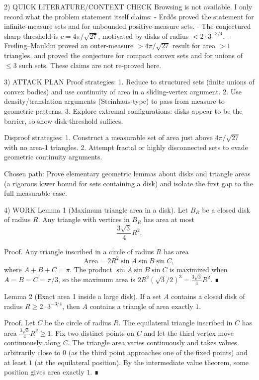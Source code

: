 2) QUICK LITERATURE/CONTEXT CHECK
Browsing is not available. I only record what the problem statement itself claims:
- Erd\H{o}s proved the statement for infinite-measure sets and for unbounded positive-measure sets.
- The conjectured sharp threshold is $c=4\pi/\sqrt{27}$, motivated by disks of radius $<2\cdot 3^{-3/4}$.
- Freiling--Mauldin proved an outer-measure $>4\pi/\sqrt{27}$ result for area $>1$ triangles,
  and proved the conjecture for compact convex sets and for unions of $\le 3$ such sets.
These claims are not re-proved here.

3) ATTACK PLAN
Proof strategies:
1. Reduce to structured sets (finite unions of convex bodies) and use continuity of area in a
   sliding-vertex argument.
2. Use density/translation arguments (Steinhaus-type) to pass from measure to geometric patterns.
3. Explore extremal configurations: disks appear to be the barrier, so show disk-threshold suffices.

Disproof strategies:
1. Construct a measurable set of area just above $4\pi/\sqrt{27}$ with no area-1 triangles.
2. Attempt fractal or highly disconnected sets to evade geometric continuity arguments.

Chosen path: Prove elementary geometric lemmas about disks and triangle areas (a rigorous lower bound
for sets containing a disk) and isolate the first gap to the full measurable case.

4) WORK
Lemma 1 (Maximum triangle area in a disk).
Let $B_R$ be a closed disk of radius $R$. Any triangle with vertices in $B_R$ has area at most
\[\frac{3\sqrt{3}}{4}R^2.\]

Proof.
Any triangle inscribed in a circle of radius $R$ has area
\[\text{Area} = 2R^2\sin A\sin B\sin C,\]
where $A+B+C=\pi$. The product $\sin A\sin B\sin C$ is maximized when $A=B=C=\pi/3$,
so the maximum area is $2R^2(\sqrt{3}/2)^3 = \frac{3\sqrt{3}}{4}R^2$. ∎

Lemma 2 (Exact area 1 inside a large disk).
If a set $A$ contains a closed disk of radius $R\ge 2\cdot 3^{-3/4}$, then $A$ contains a
triangle of area exactly $1$.

Proof.
Let $C$ be the circle of radius $R$. The equilateral triangle inscribed in $C$ has area
$\frac{3\sqrt{3}}{4}R^2\ge 1$. Fix two distinct points on $C$ and let the third vertex move
continuously along $C$. The triangle area varies continuously and takes values arbitrarily close to
$0$ (as the third point approaches one of the fixed points) and at least $1$ (at the equilateral
position). By the intermediate value theorem, some position gives area exactly $1$. ∎

